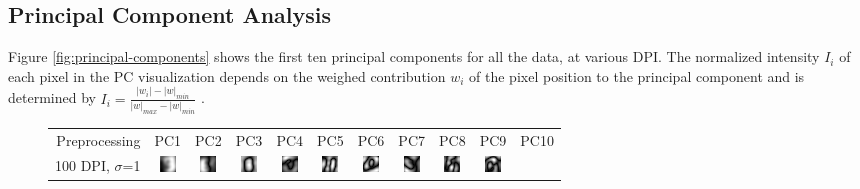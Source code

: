 \subsection{Principal Component Analysis}
Figure \ref{fig:principal-components} shows the first ten principal
components for all the data, at various DPI.
The normalized intensity \(I_i\) of each pixel in the PC visualization
depends on the weighed contribution \(w_i\) of the pixel position to the principal component
and is determined by
\(I_i=\frac{\left|w_i\right|-\left|w\right|_{min}}{\left|w\right|_{max}-\left|w\right|_{min}}\)
.
\begin{figure}[h]
\centering
\setlength\tabcolsep{1pt}
\begin{tabular}{r*{10}{c}}
Preprocessing & PC1 & PC2 & PC3 & PC4 & PC5 & PC6 & PC7 & PC8 & PC9 & PC10 \\
100 DPI, \(\sigma\)=1
 & \includegraphics[width=\smallfigscale]{img/pca-All-dpi100-sigma1-pc1} 
 & \includegraphics[width=\smallfigscale]{img/pca-All-dpi100-sigma1-pc2} 
 & \includegraphics[width=\smallfigscale]{img/pca-All-dpi100-sigma1-pc3} 
 & \includegraphics[width=\smallfigscale]{img/pca-All-dpi100-sigma1-pc4} 
 & \includegraphics[width=\smallfigscale]{img/pca-All-dpi100-sigma1-pc5} 
 & \includegraphics[width=\smallfigscale]{img/pca-All-dpi100-sigma1-pc6} 
 & \includegraphics[width=\smallfigscale]{img/pca-All-dpi100-sigma1-pc7} 
 & \includegraphics[width=\smallfigscale]{img/pca-All-dpi100-sigma1-pc8} 
 & \includegraphics[width=\smallfigscale]{img/pca-All-dpi100-sigma1-pc9} 

\end{tabular}
\end{figure}

